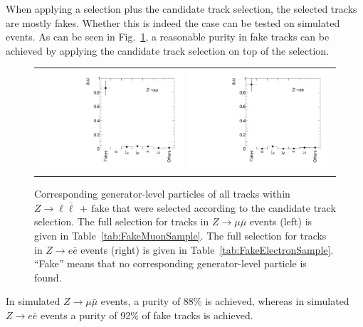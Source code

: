 When applying a \Zlep selection plus the candidate track selection, the selected tracks are mostly fakes.
Whether this is indeed the case can be tested on simulated \Zlep events.
As can be seen in Fig.~\ref{fig:BkgComposition}, a reasonable purity in fake tracks can be achieved by applying the candidate track selection on top of the \Zlep selection.
\begin{figure}[!tb]
  \centering 
  \begin{tabular}{c}
    \includegraphics[width=0.49\textwidth]{figures/analysis/Background/ParticleCompositionInFakeCS_Mu.pdf}
    \includegraphics[width=0.49\textwidth]{figures/analysis/Background/ParticleCompositionInFakeCS_Ele.pdf}
  \end{tabular}
  \caption{Corresponding generator-level particles of all tracks within $Z\rightarrow \ell \bar{\ell}\,+\,\text{fake}$ that were selected according to the candidate track selection. 
           The full selection for tracks in $Z\rightarrow \mu \bar{\mu}$ events (left) is given in Table~\ref{tab:FakeMuonSample}.
           The full selection for tracks in $Z\rightarrow e \bar{e}$ events (right) is given in Table~\ref{tab:FakeElectronSample}.
           ``Fake'' means that no corresponding generator-level particle is found. }
  \label{fig:BkgComposition}
\end{figure}
In simulated $Z\rightarrow\mu\bar{\mu}$ events, a purity of 88\% is achieved, whereas in simulated $Z\rightarrow e\bar{e}$ events a purity of 92\% of fake tracks is achieved.



